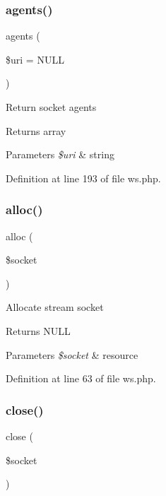 \subsubsection{\texorpdfstring{agents()}{agents()}}
{\footnotesize\ttfamily agents (\begin{DoxyParamCaption}\item[{}]{\$uri = {\ttfamily NULL} }\end{DoxyParamCaption})}

Return socket agents \begin{DoxyReturn}{Returns}
array 
\end{DoxyReturn}

\begin{DoxyParams}{Parameters}
{\em \$uri} & string \\
\hline
\end{DoxyParams}


Definition at line 193 of file ws.\+php.

\hypertarget{class_c_l_i_1_1_w_s_a201f40e4b8683b5e569b4c1e8add9fcd}{}\label{class_c_l_i_1_1_w_s_a201f40e4b8683b5e569b4c1e8add9fcd} 
\subsubsection{\texorpdfstring{alloc()}{alloc()}}
{\footnotesize\ttfamily alloc (\begin{DoxyParamCaption}\item[{}]{\$socket }\end{DoxyParamCaption})}

Allocate stream socket \begin{DoxyReturn}{Returns}
N\+U\+LL 
\end{DoxyReturn}

\begin{DoxyParams}{Parameters}
{\em \$socket} & resource \\
\hline
\end{DoxyParams}


Definition at line 63 of file ws.\+php.

\hypertarget{class_c_l_i_1_1_w_s_aa3a3bd26af1b767091f521a6c9041e56}{}\label{class_c_l_i_1_1_w_s_aa3a3bd26af1b767091f521a6c9041e56} 
\subsubsection{\texorpdfstring{close()}{close()}}
{\footnotesize\ttfamily close (\begin{DoxyParamCaption}\item[{}]{\$socket }\end{DoxyParamCaption})}

